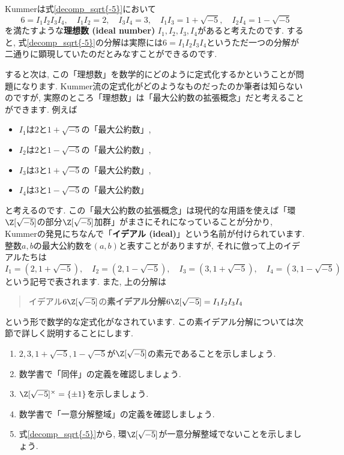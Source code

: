 \documentclass[11pt,b5paper,oneside,titlepage,lualatex]{ltjsreport}
\begin{document}
Kummerは式\eqref{decomp_sqrt{-5}}において
\[
6 = I_1 I_2 I_3 I_4, \quad
I_1 I_2 = 2, \quad
I_3 I_4 = 3, \quad
I_1 I_3 = 1 + \sqrt{-5}, \quad
I_2 I_4 = 1 - \sqrt{-5}
\]
を満たすような\textbf{理想数 (ideal number)} $ I_1, I_2, I_3, I_4 $があると考えたのです. 
すると, 式\eqref{decomp_sqrt{-5}}の分解は実際には$ 6 = I_1 I_2 I_3 I_4 $というただ一つの分解が二通りに顕現していたのだとみなすことができるのです. 

すると次は, この「理想数」を数学的にどのように定式化するかということが問題になります.
Kummer流の定式化がどのようなものだったのか筆者は知らないのですが, 実際のところ「理想数」は「最大公約数の拡張概念」だと考えることができます. 
例えば
\begin{itemize}
	\item $ I_1 $は$ 2 $と$ 1 + \sqrt{-5} $の「最大公約数」, 
	\item $ I_2 $は$ 2 $と$ 1 - \sqrt{-5} $の「最大公約数」, 
	\item $ I_3 $は$ 3 $と$ 1 + \sqrt{-5} $の「最大公約数」, 
	\item $ I_4 $は$ 3 $と$ 1 - \sqrt{-5} $の「最大公約数」
\end{itemize}
と考えるのです. 
この「最大公約数の拡張概念」は現代的な用語を使えば「環$ \Z[\sqrt{-5}] $の部分$ \Z[\sqrt{-5}] $加群」がまさにそれになっていることが分かり, Kummerの発見にちなんで「\textbf{イデアル (ideal)}」という名前が付けられています. 
整数$ a, b $の最大公約数を$ (a, b) $と表すことがありますが, それに倣って上のイデアルたちは
\[
I_1 = (2, 1 + \sqrt{-5} ), \quad
I_2 = (2, 1 - \sqrt{-5}), \quad
I_3 = (3, 1 + \sqrt{-5}), \quad
I_4 = (3, 1 - \sqrt{-5})
\]
という記号で表されます. 
また, 上の分解は
\begin{quote}
	\centering
	イデアル$ 6 \Z[\sqrt{-5}] $の\textbf{素イデアル分解}$ 6 \Z[\sqrt{-5}] = I_1 I_2 I_3 I_4 $
\end{quote}
という形で数学的な定式化がなされています. 
この素イデアル分解については次節で詳しく説明することにします. 

\begin{exc}{}{}
	\begin{enumerate}
		\item $ 2, 3, 1 + \sqrt{-5}, 1 - \sqrt{-5} $が$ \Z[\sqrt{-5}] $の素元であることを示しましょう. 
		\item 数学書で「同伴」の定義を確認しましょう. 
		\item $ \Z[\sqrt{-5}]^\times = \{ \pm 1 \} $を示しましょう. 
		\item 数学書で「一意分解整域」の定義を確認しましょう. 
		\item 式\eqref{decomp_sqrt{-5}}から, 環$ \Z[\sqrt{-5}] $が一意分解整域でないことを示しましょう. 
	\end{enumerate}
\end{exc}
\end{document}
